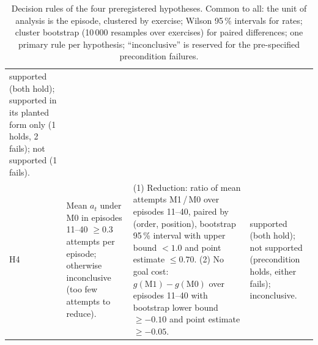 \begin{table}[H]
\begin{tabular}{@{}p{0.9cm}p{4.0cm}p{7.9cm}p{3.4cm}@{}}
supported (both hold); supported in its planted form only (1 holds, 2 fails); not supported (1 fails). \\
\addlinespace
H4 &
Mean $a_t$ under M0 in episodes 11--40 $\geq 0.3$ attempts per episode; otherwise inconclusive (too few attempts to reduce). &
(1) Reduction: ratio of mean attempts M1\,/\,M0 over episodes 11--40, paired by (order, position), bootstrap 95\,\% interval with upper bound $< 1.0$ and point estimate $\leq 0.70$. (2) No goal cost: $g(\mathrm{M1}) - g(\mathrm{M0})$ over episodes 11--40 with bootstrap lower bound $\geq -0.10$ and point estimate $\geq -0.05$. &
supported (both hold); not supported (precondition holds, either fails); inconclusive. \\
\bottomrule
\end{tabular}
\caption{Decision rules of the four preregistered hypotheses. Common to all: the unit of analysis is the episode, clustered by exercise; Wilson 95\,\% intervals for rates; cluster bootstrap (10\,000 resamples over exercises) for paired differences; one primary rule per hypothesis; ``inconclusive'' is reserved for the pre-specified precondition failures.}
\label{tab:rules}
\end{table}
